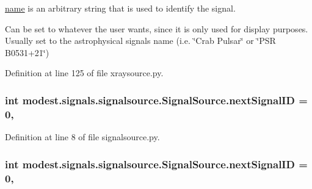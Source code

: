 \hyperlink{classmodest_1_1signals_1_1xraysource_1_1PeriodicXRaySource_aac8308319d4f31067e1087660a15db03}{name} is an arbitrary string that is used to identify the signal. 

Can be set to whatever the user wants, since it is only used for display purposes. Usually set to the astrophysical signal\textquotesingle{}s name (i.\+e. \char`\"{}\+Crab Pulsar\char`\"{} or \char`\"{}\+P\+S\+R B0531+21\char`\"{}) 

Definition at line 125 of file xraysource.\+py.

\subsubsection[{\texorpdfstring{next\+Signal\+ID}{nextSignalID}}]{\setlength{\rightskip}{0pt plus 5cm}int modest.\+signals.\+signalsource.\+Signal\+Source.\+next\+Signal\+ID = 0\hspace{0.3cm}{\ttfamily [static]}, {\ttfamily [inherited]}}\hypertarget{classmodest_1_1signals_1_1signalsource_1_1SignalSource_a453eafb550b551adbec0903deb63dfce}{}\label{classmodest_1_1signals_1_1signalsource_1_1SignalSource_a453eafb550b551adbec0903deb63dfce}


Definition at line 8 of file signalsource.\+py.

\subsubsection[{\texorpdfstring{next\+Signal\+ID}{nextSignalID}}]{\setlength{\rightskip}{0pt plus 5cm}int modest.\+signals.\+signalsource.\+Signal\+Source.\+next\+Signal\+ID = 0\hspace{0.3cm}{\ttfamily [static]}, {\ttfamily [inherited]}}\hypertarget{classmodest_1_1signals_1_1signalsource_1_1SignalSource_a453eafb550b551adbec0903deb63dfce}{}\label{classmodest_1_1signals_1_1signalsource_1_1SignalSource_a453eafb550b551adbec0903deb63dfce}


